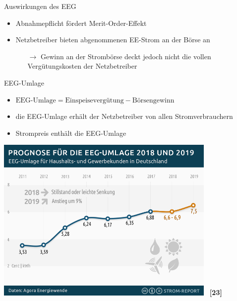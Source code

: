 \documentclass[aspectratio=1610, professionalfonts, 9pt]{beamer}
\begin{document}
\begin{frame}{Auswirkungen des EEG}
  \begin{itemize}
    \item Abnahmepflicht fördert Merit-Order-Effekt
    \item Netzbetreiber bieten abgenommenen EE-Strom an der Börse an
\begin{itemize}
  \item[$\rightarrow$] Gewinn an der Strombörse deckt jedoch nicht die vollen Vergütungskosten der Netzbetreiber
\end{itemize}
\end{itemize}
\begin{block}{EEG-Umlage}
\begin{itemize}
  \item $\text{EEG-Umlage}=\text{Einspeisevergütung}-\text{Börsengewinn}$
\item die EEG-Umlage erhält der Netzbetreiber von allen Stromverbrauchern
\item Strompreis enthält die EEG-Umlage
\end{itemize}
\end{block}
\end{frame}

{
\begin{frame}
\centering
  \includegraphics[width=0.8\textwidth]{images/eeg-umlage-2018-2019.png} \ \textbf{\textcolor{tugreen}{[23]}}
\end{frame}
}
\end{document}
